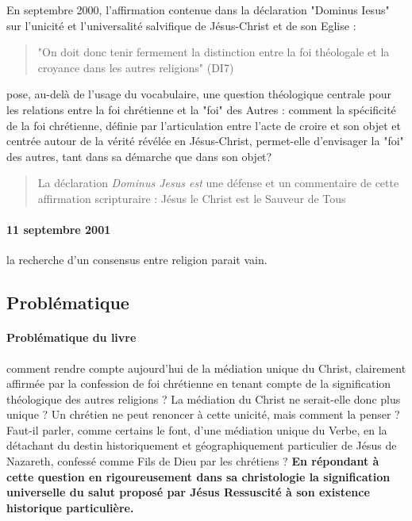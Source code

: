 En septembre 2000, l'affirmation contenue dans la déclaration "Dominus Iesus" sur l'unicité et l'universalité salvifique de Jésus-Christ et de son Eglise : 

\begin{quote}
    "On doit donc tenir fermement la distinction entre la foi théologale et la croyance dans les autres religions" (DI7) 
\end{quote} pose, au-delà de l'usage du vocabulaire, une question théologique centrale pour les relations entre la foi chrétienne et la "foi" des Autres : comment la spécificité de la foi chrétienne, définie par l'articulation entre l'acte de croire et son objet et centrée autour de la vérité révélée en Jésus-Christ, permet-elle d'envisager la "foi" des autres, tant dans sa démarche que dans son objet? 
\begin{quote}
    La déclaration \textit{Dominus Jesus est } une défense et un commentaire de cette affirmation scripturaire : Jésus le Christ est le Sauveur de Tous
\end{quote}

  
\paragraph{11 septembre 2001} la recherche d'un consensus entre religion parait vain.


 

\subsection{Problématique}
\paragraph{Problématique du livre}   comment rendre compte aujourd’hui de la médiation unique du Christ, clairement affirmée par la confession de foi chrétienne en tenant compte de la signification théologique des autres religions ?   La médiation du Christ ne serait-elle donc plus unique ? Un chrétien ne peut renoncer à cette unicité, mais comment la penser ? Faut-il parler, comme certains le font, d’une médiation unique du Verbe, en la détachant du destin historiquement et géographiquement particulier de Jésus de Nazareth, confessé comme Fils de Dieu par les chrétiens ?  \textbf{En répondant à cette question en  rigoureusement dans sa christologie la signification universelle du salut proposé par Jésus Ressuscité à son existence historique particulière.}  

